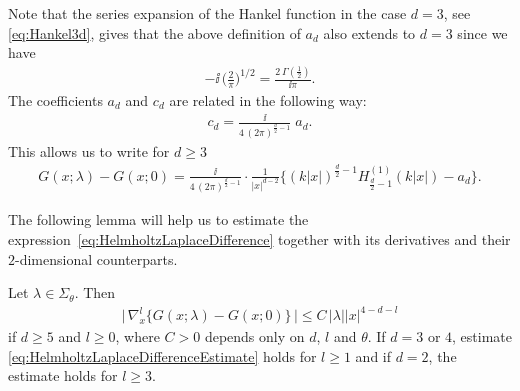 Note that the series expansion of the Hankel function in the case $d = 3$, see \eqref{eq:Hankel3d}, gives that the above definition of $a_d$ also extends to $d = 3$ since we have
\begin{align*}
  -\ii\, \bigg( \frac{2}{\pi} \bigg)^{1/2} = \frac{2\, \Gamma(\frac{1}{2})}{\ii\pi}.
\end{align*}
The coefficients $a_d$ and $c_d$ are related in the following way:
\begin{align*}
  c_d 
  =\frac{\ii} {4\, (2 \pi)^{\frac{d}{2} - 1}}\; a_d .
\end{align*}
This allows us to write for $d \geq 3$
\begin{align}
  \label{eq:HelmholtzLaplaceDifference}
  G(x;\lambda) - G(x; 0) = \frac{\ii}{4\,(2\pi)^{\frac{d}{2} - 1}} \cdot \frac{1}{|x|^{d - 2}} \Big\{ (k|x|)^{\frac{d}{2} - 1} H_{\frac{d}{2} - 1}^{(1)}(k|x|) - a_d \Big\}.
\end{align}

The following lemma will help us to estimate the expression~\eqref{eq:HelmholtzLaplaceDifference} together with its derivatives and their $2$-dimensional counterparts.

\begin{lem}
  \label{lem:HelmholtzLaplaceDifference}
  Let $\lambda \in \Sigma_\theta$.
  Then
  \begin{align}
    \label{eq:HelmholtzLaplaceDifferenceEstimate}
    \Big|\,\nabla_x^l \Big\{ G(x; \lambda) - G(x; 0) \Big\}\,\Big| \leq C\, |\lambda| |x|^{4 - d - l}
  \end{align}
  if $d \geq 5$ and $l \geq 0$, where $C  > 0$ depends only on $d$, $l$ and $\theta$.
  If $d = 3$ or $4$, estimate \eqref{eq:HelmholtzLaplaceDifferenceEstimate} holds for $l \geq 1$ and if $d = 2$, the estimate holds for $l \geq 3$.
\end{lem}

